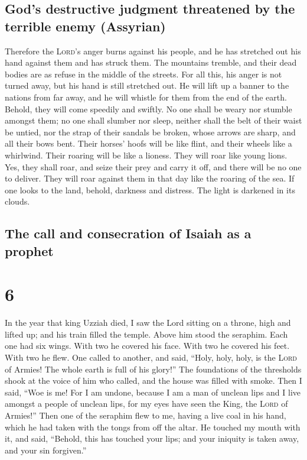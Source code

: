 \hypertarget{gods-destructive-judgment-threatened-by-the-terrible-enemy-assyrian}{%
\subsection{God's destructive judgment threatened by the terrible enemy
(Assyrian)}\label{gods-destructive-judgment-threatened-by-the-terrible-enemy-assyrian}}

 Therefore the \textsc{Lord}'s anger burns against his
people, and he has stretched out his hand against them and has struck
them. The mountains tremble, and their dead bodies are as refuse in the
middle of the streets. For all this, his anger is not turned away, but
his hand is still stretched out.  He will lift up a
banner to the nations from far away, and he will whistle for them from
the end of the earth. Behold, they will come speedily and swiftly.
 No one shall be weary nor stumble amongst them; no one
shall slumber nor sleep, neither shall the belt of their waist be
untied, nor the strap of their sandals be broken,  whose
arrows are sharp, and all their bows bent. Their horses' hoofs will be
like flint, and their wheels like a whirlwind.  Their
roaring will be like a lioness. They will roar like young lions. Yes,
they shall roar, and seize their prey and carry it off, and there will
be no one to deliver.  They will roar against them in
that day like the roaring of the sea. If one looks to the land, behold,
darkness and distress. The light is darkened in its clouds.

\hypertarget{the-call-and-consecration-of-isaiah-as-a-prophet}{%
\subsection{The call and consecration of Isaiah as a
prophet}\label{the-call-and-consecration-of-isaiah-as-a-prophet}}

\hypertarget{section-5}{%
\section{6}\label{section-5}}

 In the year that king Uzziah died, I saw the Lord sitting
on a throne, high and lifted up; and his train filled the temple.
 Above him stood the seraphim. Each one had six wings.
With two he covered his face. With two he covered his feet. With two he
flew.  One called to another, and said, ``Holy, holy,
holy, is the \textsc{Lord} of Armies! The whole earth is full of his
glory!''  The foundations of the thresholds shook at the
voice of him who called, and the house was filled with smoke.
 Then I said, ``Woe is me! For I am undone, because I am a
man of unclean lips and I live amongst a people of unclean lips, for my
eyes have seen the King, the \textsc{Lord} of Armies!'' 
Then one of the seraphim flew to me, having a live coal in his hand,
which he had taken with the tongs from off the altar.  He
touched my mouth with it, and said, ``Behold, this has touched your
lips; and your iniquity is taken away, and your sin forgiven.''

